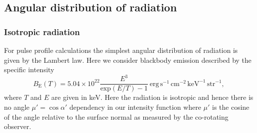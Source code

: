 \documentclass[iop, usenatbib]{emulateapj}
\newcommand{\be}{\begin{equation}}
\newcommand{\ee}{\end{equation}}
\newcommand{\sch}{Schwarzschild }
\newcommand{\rb}{\ensuremath{\bar{r}}}
\newcommand{\nub}{\ensuremath{\bar{\nu}}}
\newcommand{\zetab}{\ensuremath{\bar{\zeta}}}
\newcommand{\Bb}{\ensuremath{\bar{B}}}
\begin{document}

\subsection{Angular distribution of radiation}
\subsubsection{Isotropic radiation}

For pulse profile calculations the simplest angular distribution of radiation is given by the Lambert law.  
Here we consider blackbody emission described by the specific intensity
\begin{equation}
  B_{\mathrm{E}}(T) = 5.04 \times 10^{22} \frac{E^3}{\mathrm{exp}(E/T) -1}~\mathrm{erg}\,\mathrm{s}^{-1}\,\mathrm{cm}^{-2}\,\mathrm{keV}^{-1}\,\mathrm{str}^{-1},
\end{equation}
where $T$ and $E$ are given in keV.
Here the radiation is isotropic and hence there is no angle $\mu' = \cos\alpha'$ dependency in our intensity function where $\mu'$ is the cosine of the angle relative to the surface normal as measured by the co-rotating observer.
\end{document}
